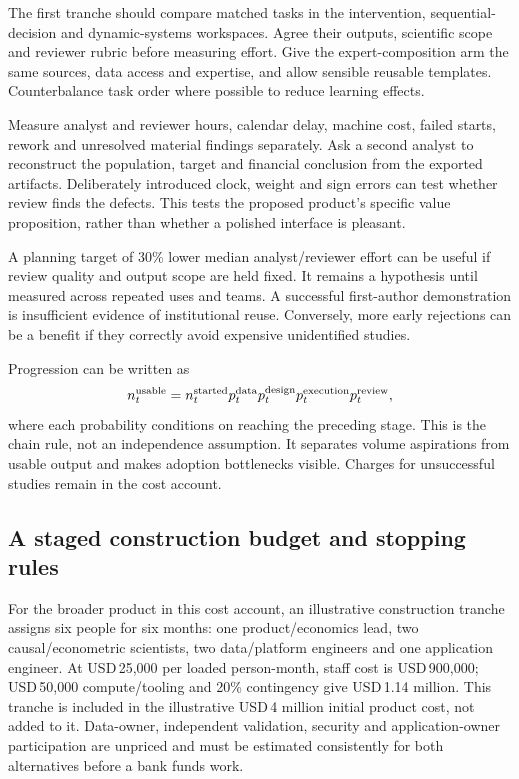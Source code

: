 The first tranche should compare matched tasks in the intervention,
sequential-decision and dynamic-systems workspaces. Agree their outputs,
scientific scope and reviewer rubric before measuring effort. Give the
expert-composition arm the same sources, data access and expertise, and
allow sensible reusable templates. Counterbalance task order where
possible to reduce learning effects.

Measure analyst and reviewer hours, calendar delay, machine cost,
failed starts, rework and unresolved material findings separately.
Ask a second analyst to reconstruct the population, target and financial
conclusion from the exported artifacts. Deliberately introduced clock,
weight and sign errors can test whether review finds the defects.
This tests the proposed product's specific value proposition, rather
than whether a polished interface is pleasant.

A planning target of 30\% lower median analyst/reviewer effort can be
useful if review quality and output scope are held fixed. It remains
a hypothesis until measured across repeated uses and teams. A successful
first-author demonstration is insufficient evidence of institutional
reuse. Conversely, more early rejections can be a benefit if they
correctly avoid expensive unidentified studies.

Progression can be written as
\[
 n_t^{\rm usable}=n_t^{\rm started}
 p_t^{\rm data}p_t^{\rm design}p_t^{\rm execution}p_t^{\rm review},
\]
where each probability conditions on reaching the preceding stage.
This is the chain rule, not an independence assumption. It separates
volume aspirations from usable output and makes adoption bottlenecks
visible. Charges for unsuccessful studies remain in the cost account.

\subsection{A staged construction budget and stopping rules}
\label{r3:investment-sequence}

For the broader product in this cost account, an illustrative construction
tranche assigns six people for six months:
one product/economics lead, two causal/econometric scientists, two
data/platform engineers and one application engineer. At USD\,25,000
per loaded person-month, staff cost is USD\,900,000; USD\,50,000
compute/tooling and 20\% contingency give USD\,1.14 million.
This tranche is included in the illustrative USD\,4 million initial
product cost, not added to it. Data-owner, independent validation,
security and application-owner participation are unpriced and must
be estimated consistently for both alternatives before a bank funds work.

